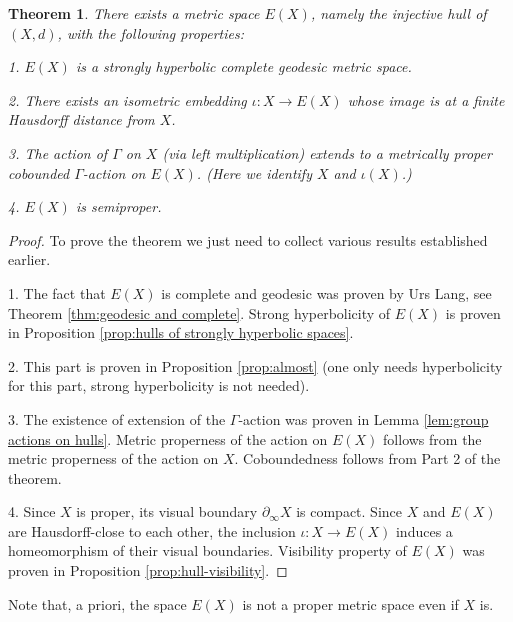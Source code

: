 \documentclass[12pt]{amsbook}%
\newtheorem{thm}{Theorem}[chapter]
\theoremstyle{definition}
\newtheorem{question}[thm]{Question}
\theoremstyle{remark}
\numberwithin{section}{chapter}
\numberwithin{subsection}{section}
\numberwithin{figure}{chapter}
\def\Ga{\Gamma}
\def\geo{\partial_\infty}
\begin{document}
\begin{thm}\label{thm:hull}
There exists a metric space $E(X)$, namely the {\em injective hull} of $(X,d)$, with the following properties:

1. $E(X)$ is a strongly hyperbolic complete geodesic metric space. 

2. There exists an isometric embedding $\iota: X\to E(X)$ whose image is at a finite Hausdorff distance from $X$. 

3. The action of $\Ga$ on $X$ (via left multiplication) extends to a metrically proper cobounded $\Ga$-action on $E(X)$. 
(Here we identify $X$ and $\iota(X)$.)  

4. %
$E(X)$ is semiproper. 
\end{thm}
\begin{proof} To prove the theorem we just need to collect various results established earlier. 

1. The fact that $E(X)$ is complete and geodesic was proven by Urs Lang, see Theorem \ref{thm:geodesic and complete}. Strong hyperbolicity of $E(X)$ is proven in Proposition \ref{prop:hulls of strongly hyperbolic spaces}. 

2. This part is proven in Proposition \ref{prop:almost} (one only needs hyperbolicity for this part, strong hyperbolicity is not needed). 

3. The existence of extension of the $\Ga$-action was proven in Lemma \ref{lem:group actions on hulls}. Metric properness of the action on $E(X)$ follows from the metric properness of the action on $X$. Coboundedness follows from Part 2 of the theorem.

4. Since $X$ is proper, its visual boundary $\geo X$ is compact. Since $X$ and $E(X)$ are Hausdorff-close to each  other, the inclusion 
$\iota: X\to E(X)$ induces a homeomorphism of their visual boundaries. Visibility property of $E(X)$ was proven in Proposition \ref{prop:hull-visibility}. 
\end{proof}

Note that, a priori, the space $E(X)$ is not  a proper metric space even if $X$ is. 



\end{document}
